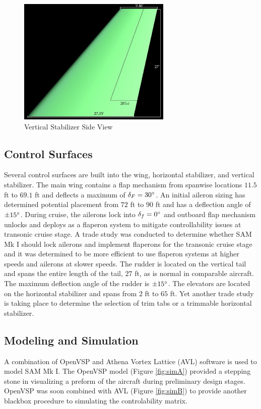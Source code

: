 \begin{figure}[!h]
    \centering
    \includegraphics[width=0.65\textwidth]{Photos/stab/vtail.jpg}
    \caption{Vertical Stabilizer Side View}
    \label{fig:vtailstab}
\end{figure}
\clearpage

\subsection{Control Surfaces}
Several control surfaces are built into the wing, horizontal stabilizer, and vertical stabilizer.  The main wing contains a flap mechanism from spanwise locations $11.5$ ft to $69.1$ ft and deflects a maximum of $\delta_F = 30\degree$.  An initial aileron sizing has determined potential placement from $72$ ft to $90$ ft and has a deflection angle of $\pm 15\degree$.  During cruise, the ailerons lock into $\delta_f = 0\degree$ and outboard flap mechanism unlocks and deploys as a flaperon system to mitigate controllability issues at transonic cruise stage.  A trade study was conducted to determine whether SAM Mk I should lock ailerons and implement flaperons for the transonic cruise stage and it was determined to be more efficient to use flaperon systems at higher speeds and ailerons at slower speeds.  The rudder is located on the vertical tail and spans the entire length of the tail, $27$ ft, as is normal in comparable aircraft.  The maximum deflection angle of the rudder is $\pm 15\degree$.  The elevators are located on the horizontal stabilizer and spans from $2$ ft to $65$ ft.  Yet another trade study is taking place to determine the selection of trim tabs or a trimmable horizontal stabilizer.

\subsection{Modeling and Simulation}
A combination of OpenVSP and Athena Vortex Lattice (AVL) software is used to model SAM Mk I.  The OpenVSP model (Figure \ref{fig:simA}) provided a stepping stone in visualizing a preform of the aircraft during preliminary design stages.  OpenVSP was soon combined with AVL (Figure \ref{fig:simB}) to provide another blackbox procedure to simulating the controlability matrix. 

